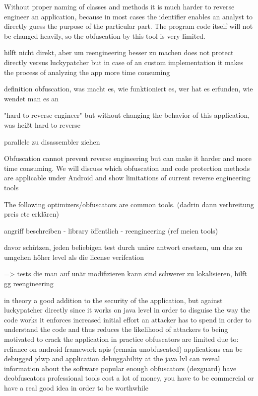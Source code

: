 Without proper naming of classes and methods it is much harder to reverse engineer an application, because in most cases the identifier enables an analyst to directly guess the purpose of the particular part. The program code itself will not be changed heavily, so the obfuscation by this tool is very limited.

hilft nicht direkt, aber um reengineering besser zu machen
does not protect directly versus luckypatcher but in case of an custom implementation it makes the process of analyzing the app more time consuming

definition obfuscation, was macht es, wie funktioniert es, wer hat es erfunden, wie wendet man es an\newline

"hard to reverse engineer" but without changing the behavior of this
application, was heißt hard to reverse\newline

parallele zu disassembler ziehen\newline

Obfuscation cannot prevent reverse engineering but can make it harder and more time consuming. We will discuss which obfuscation and code protection methods are applicable under Android and show limitations of current reverse engineering tools\newline

The following optimizers/obfuscators are common tools. (dadrin dann verbreitung preis etc erklären)





angriff beschreiben
- library öffentlich
- reengineering (ref meien tools)

davor schützen, jeden beliebigen test durch unäre antwort ersetzen, um das zu umgehen höher level als die license verifcation

=> tests die man auf unär modifizieren kann sind schwerer zu lokalisieren, hilft gg reengineering



in theory a good addition to the security of the application, but against luckypatcher directly since it works on java level in order to disguise the way the code works
it enforces increased initial effort an attacker has to spend in order to understand the code and thus reduces the likelihood of attackers to being motivated to crack the application
in practice obfuscators are limited due to:
reliance on android framework apis (remain unobfuscated)
applications can be debugged
jdwp and application debuggability at the java lvl can reveal information about the software
popular enough obfuscators (dexguard) have deobfuscators
professional tools cost a lot of money, you have to be commercial or have a real good idea in order to be worthwhile
